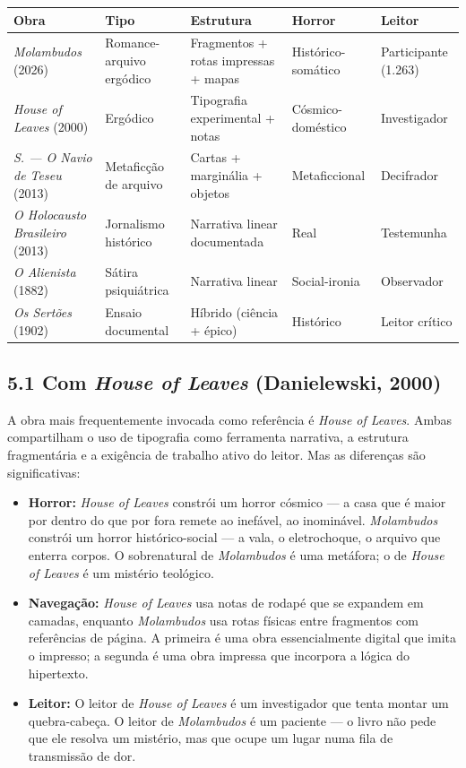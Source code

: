 \documentclass[14pt,openany]{extbook}
\begin{document}
\small\setlength{\tabcolsep}{3pt}
\begin{longtable}{>{\arraybackslash}p{3.1cm}>{\arraybackslash}p{2.1cm}>{\arraybackslash}p{2.2cm}>{\arraybackslash}p{2.2cm}>{\arraybackslash}p{2.0cm}}
\toprule
\textbf{Obra} & \textbf{Tipo} & \textbf{Estrutura} & \textbf{Horror} & \textbf{Leitor} \\
\midrule
\endhead
\textit{Molambudos} (2026) & Romance-arquivo ergódico & Fragmentos + rotas impressas + mapas & Histórico-somático & Participante (1.263) \\
\hline
\textit{House of Leaves} (2000) & Ergódico & Tipografia experimental + notas & Cósmico-doméstico & Investigador \\
\hline
\textit{S. --- O Navio de Teseu} (2013) & Metaficção de arquivo & Cartas + marginália + objetos & Metaficcional & Decifrador \\
\hline
\textit{O Holocausto Brasileiro} (2013) & Jornalismo histórico & Narrativa linear documentada & Real & Testemunha \\
\hline
\textit{O Alienista} (1882) & Sátira psiquiátrica & Narrativa linear & Social-ironia & Observador \\
\hline
\textit{Os Sertões} (1902) & Ensaio documental & Híbrido (ciência + épico) & Histórico & Leitor crítico \\
\hline
\bottomrule
\end{longtable}
\normalsize\setlength{\tabcolsep}{6pt}

\subsection*{5.1 Com \textit{House of Leaves} (Danielewski, 2000)}

A obra mais frequentemente invocada como referência é \textit{House of Leaves}. Ambas compartilham o uso de tipografia como ferramenta narrativa, a estrutura fragmentária e a exigência de trabalho ativo do leitor. Mas as diferenças são significativas:

\begin{itemize}
\item \textbf{Horror:} \textit{House of Leaves} constrói um horror cósmico --- a casa que é maior por dentro do que por fora remete ao inefável, ao inominável. \textit{Molambudos} constrói um horror histórico-social --- a vala, o eletrochoque, o arquivo que enterra corpos. O sobrenatural de \textit{Molambudos} é uma metáfora; o de \textit{House of Leaves} é um mistério teológico.
\item \textbf{Navegação:} \textit{House of Leaves} usa notas de rodapé que se expandem em camadas, enquanto \textit{Molambudos} usa rotas físicas entre fragmentos com referências de página. A primeira é uma obra essencialmente digital que imita o impresso; a segunda é uma obra impressa que incorpora a lógica do hipertexto.
\item \textbf{Leitor:} O leitor de \textit{House of Leaves} é um investigador que tenta montar um quebra-cabeça. O leitor de \textit{Molambudos} é um paciente --- o livro não pede que ele resolva um mistério, mas que ocupe um lugar numa fila de transmissão de dor.
\end{itemize}
\end{document}
